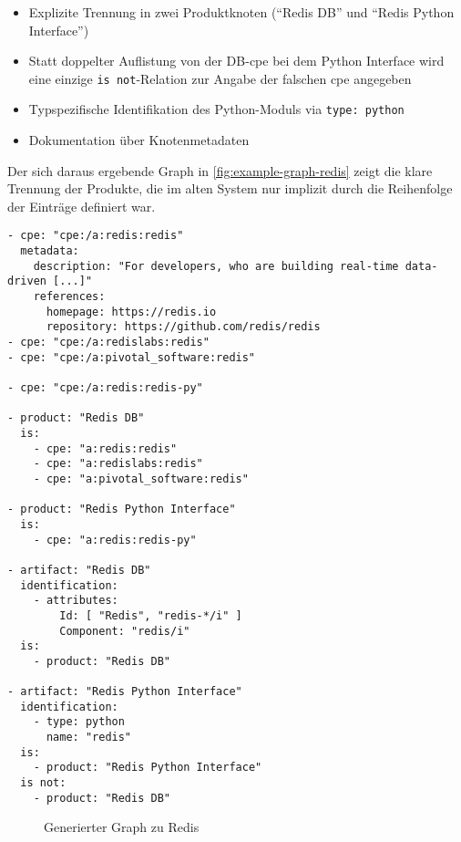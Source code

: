 \begin{itemize}
    \itemsep0em
    \item Explizite Trennung in zwei Produktknoten (\enquote{Redis DB} und \enquote{Redis Python Interface})
    \item Statt doppelter Auflistung von der DB-\acrshort{cpe} bei dem Python Interface wird eine einzige \texttt{is not}-Relation zur Angabe der falschen \acrshort{cpe} angegeben
    \item Typspezifische Identifikation des Python-Moduls via \texttt{type: python}
    \item Dokumentation über Knotenmetadaten
\end{itemize}

Der sich daraus ergebende Graph in \autoref{fig:example-graph-redis} zeigt die klare Trennung der Produkte, die im alten System nur implizit durch die Reihenfolge der Einträge definiert war.

\begin{lstlisting}[style=yaml,caption={Produktmodellierung zu Redis},label={lst:new-correlation-redis},basicstyle=\ttfamily\scriptsize]
- cpe: "cpe:/a:redis:redis"
  metadata:
    description: "For developers, who are building real-time data-driven [...]"
    references:
      homepage: https://redis.io
      repository: https://github.com/redis/redis
- cpe: "cpe:/a:redislabs:redis"
- cpe: "cpe:/a:pivotal_software:redis"

- cpe: "cpe:/a:redis:redis-py"

- product: "Redis DB"
  is:
    - cpe: "a:redis:redis"
    - cpe: "a:redislabs:redis"
    - cpe: "a:pivotal_software:redis"

- product: "Redis Python Interface"
  is:
    - cpe: "a:redis:redis-py"

- artifact: "Redis DB"
  identification:
    - attributes:
        Id: [ "Redis", "redis-*/i" ]
        Component: "redis/i"
  is:
    - product: "Redis DB"

- artifact: "Redis Python Interface"
  identification:
    - type: python
      name: "redis"
  is:
    - product: "Redis Python Interface"
  is not:
    - product: "Redis DB"
\end{lstlisting}

\begin{figure}[htbp]
    \centering
    \makebox[\textwidth]{}
    \caption{Generierter Graph zu Redis}
    \label{fig:example-graph-redis}
\end{figure}

